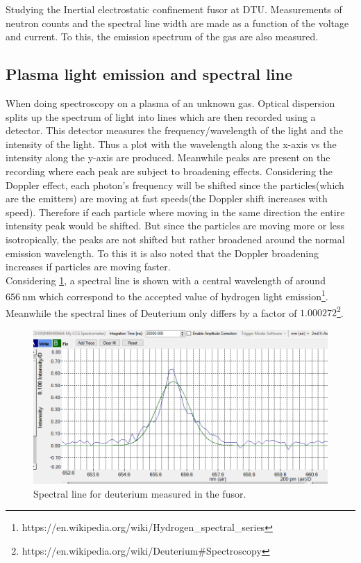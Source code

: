 Studying the Inertial electrostatic confinement fusor at DTU. Measurements of neutron counts and the spectral line width are made as a function of the voltage and current. To this, the emission spectrum of the gas are also measured.
\subsection{Plasma light emission and spectral line}
When doing spectroscopy on a plasma of an unknown gas. Optical dispersion splits up the spectrum of light into lines which are then recorded using a detector. This detector measures the frequency/wavelength of the light and the intensity of the light. Thus a plot with the wavelength along the x-axis vs the intensity along the y-axis are produced. Meanwhile peaks are present on the recording where each peak are subject to broadening effects. Considering the Doppler effect, each photon's frequency will be shifted since the particles(which are the emitters) are moving at fast speeds(the Doppler shift increases with speed). Therefore if each particle where moving in the same direction the entire intensity peak would be shifted. But since the particles are moving more or less isotropically, the peaks are not shifted but rather broadened around the normal emission wavelength. To this it is also noted that the Doppler broadening increases if particles are moving faster.\\
Considering \cref{fig:Spectro}, a spectral line is shown with a central wavelength of around $\SI{656}{\nano\meter}$ which correspond to the accepted value of hydrogen light emission\footnote{https://en.wikipedia.org/wiki/Hydrogen_spectral_series}. Meanwhile the spectral lines of Deuterium only differs by a factor of $1.000272$\footnote{https://en.wikipedia.org/wiki/Deuterium#Spectroscopy}.
\begin{figure}
	\centering
	\includegraphics{Figures/D_linje.png}
	\caption{Spectral line for deuterium measured in the fusor.}
	\label{fig:Spectro}
\end{figure}